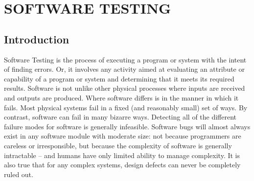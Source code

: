 \chapter{SOFTWARE TESTING}
\section{Introduction}
           Software Testing is the process of executing a program or system with the intent of finding errors. Or, it involves any activity aimed at evaluating an attribute or capability of a program or system and determining that it meets its required results. Software is not unlike other physical processes where inputs are received and outputs are produced. Where software differs is in the manner in which it fails. Most physical systems fail in a fixed (and reasonably small) set of ways. By contrast, software can fail in many bizarre ways. Detecting all of the different failure modes for software is generally infeasible. Software bugs will almost always exist in any software module with moderate size: not because programmers are careless or irresponsible, but because the complexity of software is generally intractable -- and humans have only limited ability to manage complexity. It is also true that for any complex systems, design defects can never be completely ruled out.
